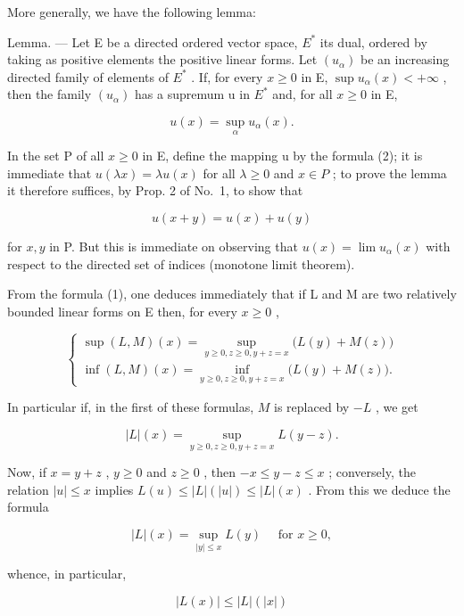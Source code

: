 More generally, we have the following lemma:

Lemma. --- Let E be a directed ordered vector space, \(E^{*}\) its dual, ordered by taking as positive elements the positive linear forms. Let \((u_{\alpha})\) be an increasing directed family of elements of \(E^{*}\) . If, for every \(x \geqslant 0\) in E, \(\sup u_{\alpha}(x) < +\infty\) , then the family \((u_{\alpha})\) has a supremum u in \(E^{*}\) and, for all \(x \geqslant 0\) in E,

\[
u (x) = \sup _ {\alpha} u _ {\alpha} (x).\tag{2}
\]

In the set P of all \(x \geqslant 0\) in E, define the mapping u by the formula (2); it is immediate that \(u(\lambda x) = \lambda u(x)\) for all \(\lambda \geqslant 0\) and \(x \in P\) ; to prove the lemma it therefore suffices, by Prop. 2 of No.~1, to show that

\[
u (x + y) = u (x) + u (y)
\]

for \(x, y\) in P. But this is immediate on observing that \(u(x) = \lim u_{\alpha}(x)\) with respect to the directed set of indices (monotone limit theorem).

From the formula (1), one deduces immediately that if L and M are two relatively bounded linear forms on E then, for every \(x \geqslant 0\) ,

\[
\left\{ \begin{array}{l} \sup (L, M) (x) = \sup _ {y \geqslant 0,   z \geqslant 0,   y + z = x} \big (L (y) + M (z) \big) \\ \inf (L, M) (x) = \inf _ {y \geqslant 0,   z \geqslant 0,   y + z = x} \big (L (y) + M (z) \big). \end{array} \right.\tag{3}
\]

In particular if, in the first of these formulas, \(M\) is replaced by \(-L\) , we get

\[
| L | (x) = \sup _ {y \geqslant 0, z \geqslant 0, y + z = x} L (y - z).
\]

Now, if \(x = y + z\) , \(y \geqslant 0\) and \(z \geqslant 0\) , then \(-x \leqslant y - z \leqslant x\) ; conversely, the relation \(|u| \leqslant x\) implies \(L(u) \leqslant |L|(|u|) \leqslant |L|(x)\) . From this we deduce the formula

\[
| L | (x) = \sup _ {| y | \leqslant x} L (y) \quad \text { for } x \geqslant 0,\tag{4}
\]

whence, in particular,

\[
| L (x) | \leqslant | L | (| x |)\tag{5}
\]

